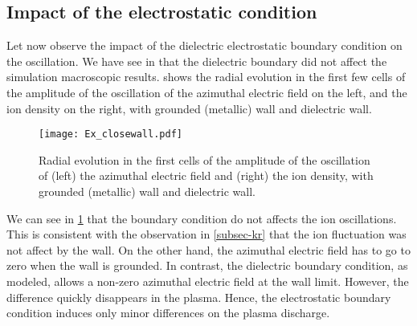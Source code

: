  
  \subsection{Impact of the electrostatic condition}
  \label{subsec-BC}
  
  Let now observe the impact of the dielectric electrostatic boundary condition on the oscillation.
  We have see in  that the dielectric boundary did not affect the simulation macroscopic results.
   shows the radial evolution in the first few cells of the amplitude of the oscillation of the azimuthal electric field on the left, and the ion density on the right, with grounded (metallic) wall and dielectric wall.
  
  \begin{figure}[hbt]
    \centering
    \texttt{[image: Ex\_closewall.pdf]}
    \caption{Radial evolution in the first cells of the amplitude of the oscillation of (left) the azimuthal electric field and (right) the ion density, with grounded (metallic) wall and dielectric wall.}
    \label{fig-closswallosci}
  \end{figure}
  
  We can see in \cref{fig-closswallosci} that the boundary condition do not affects the ion oscillations.
  This is consistent with the observation in \cref{subsec-kr} that the ion fluctuation was not affect by the wall.
  On the other hand, the azimuthal electric field has to go to zero when the wall is grounded.
  In contrast, the dielectric boundary condition, as modeled, allows a non-zero azimuthal electric field at the wall limit.
  However, the difference quickly disappears in the plasma.
  Hence, the electrostatic boundary condition induces only minor differences on the plasma discharge.
  
  